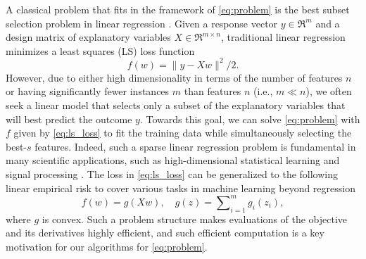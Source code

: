 \documentclass{article}
\theoremstyle{plain}
\theoremstyle{definition}
\theoremstyle{remark}
\begin{document}
A classical problem that fits in the framework of 
\cref{eq:problem} is the best subset 
selection problem in linear regression \citep{BeaKM67a,HocL67a}. Given a 
response vector $y\in \Re^{m}$ 
and a design 
matrix of explanatory variables $X\in \Re^{m\times n}$, traditional linear regression minimizes a 
least squares (LS) loss 
function 
	\begin{equation}
		f(w) = \| y - Xw\|^2/2.
		\label{eq:ls_loss}
	\end{equation}
However, due to either high dimensionality in terms 
of the number of features $n$ or having significantly fewer instances $m$ than 
features $n$ (i.e., $m\ll n$), we often seek a linear model that selects only a 
subset of the 
explanatory variables that will best predict the outcome $y$. Towards
this goal, we can solve
\cref{eq:problem} with 
$f$ given by \cref{eq:ls_loss} to fit the training data while simultaneously
selecting the best-$s$
features. Indeed, such a sparse linear regression problem is 
fundamental in many 
scientific applications, such as high-dimensional statistical learning and 
signal processing \citep{JK17}. 
The loss in \cref{eq:ls_loss} can be generalized to the following
linear empirical risk to cover various tasks in machine learning beyond regression
\begin{equation}
	f(w) = g(Xw), \quad g(z) = \sum\nolimits_{i=1}^m g_i (z_i),
	\label{eq:erm}
\end{equation}
where $g$ is convex.
Such a problem structure makes evaluations of
the objective and its derivatives highly efficient, and such efficient
computation is a key motivation for our algorithms for
\cref{eq:problem}.
\end{document}
